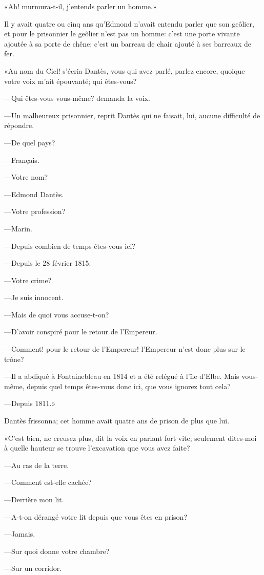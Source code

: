 «Ah! murmura-t-il, j'entends parler un homme.»

Il y avait quatre ou cinq ans qu'Edmond n'avait entendu parler que son geôlier, et pour le prisonnier le geôlier n'est pas un homme: c'est une porte vivante ajoutée à sa porte de chêne; c'est un barreau de chair ajouté à ses barreaux de fer.

«Au nom du Ciel! s'écria Dantès, vous qui avez parlé, parlez encore, quoique votre voix m'ait épouvanté; qui êtes-vous?

—Qui êtes-vous vous-même? demanda la voix.

—Un malheureux prisonnier, reprit Dantès qui ne faisait, lui, aucune difficulté de répondre.

—De quel pays?

—Français.

—Votre nom?

—Edmond Dantès.

—Votre profession?

—Marin.

—Depuis combien de temps êtes-vous ici?

—Depuis le 28 février 1815.

—Votre crime?

—Je suis innocent.

—Mais de quoi vous accuse-t-on?

—D'avoir conspiré pour le retour de l'Empereur.

—Comment! pour le retour de l'Empereur! l'Empereur n'est donc plus sur le trône?

—Il a abdiqué à Fontainebleau en 1814 et a été relégué à l'île d'Elbe. Mais vous-même, depuis quel temps êtes-vous donc ici, que vous ignorez tout cela?

—Depuis 1811.»

Dantès frissonna; cet homme avait quatre ans de prison de plus que lui.

«C'est bien, ne creusez plus, dit la voix en parlant fort vite; seulement dites-moi à quelle hauteur se trouve l'excavation que vous avez faite?

—Au ras de la terre.

—Comment est-elle cachée?

—Derrière mon lit.

—A-t-on dérangé votre lit depuis que vous êtes en prison?

—Jamais.

—Sur quoi donne votre chambre?

—Sur un corridor.

